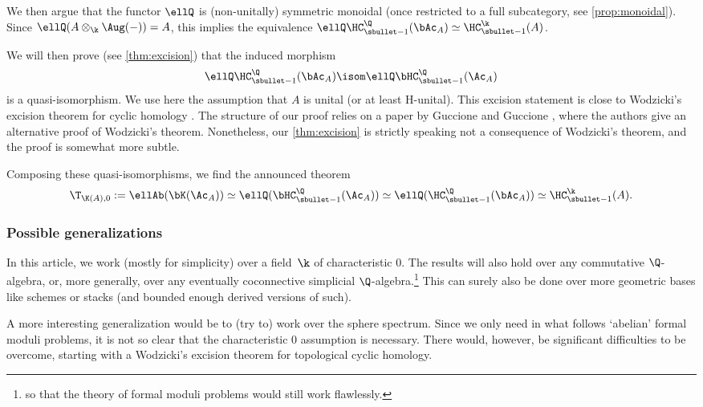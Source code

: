 We then argue that the functor $\ellQ$ is (non-unitally) symmetric monoidal (once restricted to a full subcategory, see \autoref{prop:monoidal}). Since $\ellQ(A \otimes_\k \Aug(-)) = A$, this implies the equivalence $\ellQ \HC_{\sbullet-1}^\Q(\bAc_A) \simeq \HC_{\sbullet-1}^\k(A)$.

We will then prove (see \autoref{thm:excision}) that the induced morphism
\[
\ellQ\HC_{\sbullet-1}^\Q(\bAc_A) \isom \ellQ\bHC_{\sbullet-1}^\Q(\Ac_A)
\]
is a quasi-isomorphism.
We use here the assumption that $A$ is unital (or at least H-unital). This excision statement is close to Wodzicki's excision theorem for cyclic homology \cite{wodzicki:excision}. The structure of our proof relies on a paper by Guccione and Guccione \cite{guccioneguccione}, where the authors give an alternative proof of Wodzicki's theorem.
Nonetheless, our \autoref{thm:excision} is strictly speaking not a consequence of Wodzicki's theorem, and the proof is somewhat more subtle.

Composing these quasi-isomorphisms, we find the announced theorem
\[
\T_{\K(A),0} := \ellAb(\bK(\Ac_A)) \simeq \ellQ(\bHC_{\sbullet-1}^\Q(\Ac_A)) \simeq \ellQ(\HC_{\sbullet -1}^\Q(\bAc_A)) \simeq \HC_{\sbullet-1}^\k(A).
\]

\subsubsection*{Possible generalizations}
In this article, we work (mostly for simplicity) over a field~$\k$ of characteristic $0$. The results will also hold over any commutative $\Q$-algebra, or, more generally, over any eventually coconnective simplicial $\Q$-algebra.\footnote{so that the theory of formal moduli problems would still work flawlessly.} This can surely also be done over more geometric bases like schemes or stacks (and bounded enough derived versions of such).

A more interesting generalization would be to (try to) work over the sphere spectrum. Since we only need in what follows `abelian' formal moduli problems, it is not so clear that the characteristic $0$ assumption is necessary. There would, however, be significant difficulties to be overcome, starting with a Wodzicki's excision theorem for topological cyclic homology.

